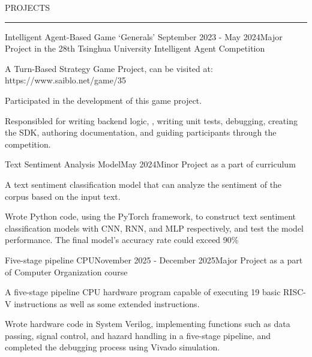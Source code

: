 \documentclass{resume} %
\renewenvironment{rSection}[1]{
\sectionskip
\textcolor{TsinghuaPurple}{\MakeUppercase{#1}}
\sectionlineskip
\hrule
\begin{list}{}{
\setlength{\leftmargin}{0em}
}
\item[]
}{
\end{list}
}
\begin{document}



\begin{rSection}{PROJECTS}

\begin{rSubsection}{Intelligent Agent-Based Game ‘Generals’} {September 2023 - May 2024}{Major Project in the 28th Tsinghua University Intelligent Agent Competition}{}

\item A Turn-Based Strategy Game Project, can be visited at: https://www.saiblo.net/game/35
\item Participated in the development of this game project.
\item Responsibled for writing backend logic, , writing unit tests, debugging, creating the SDK, authoring documentation, and guiding participants through the competition. 
 
\end{rSubsection}  


\begin{rSubsection}{Text Sentiment Analysis Model}{May 2024}{Minor Project as a part of curriculum}{} 
\item A text sentiment classification model that can analyze the sentiment of the corpus based on the input text.
\item Wrote Python code, using the PyTorch framework, to construct text sentiment classification models with CNN, RNN, and MLP respectively, and test the model performance. The final model’s accuracy rate could exceed 90\%  

\end{rSubsection}



\begin{rSubsection}{Five-stage pipeline CPU}{November 2025 - December 2025}{Major Project as a part of Computer Organization course}{}

\item A five-stage pipeline CPU hardware program capable of executing 19 basic RISC-V instructions as well as some extended instructions.
\item Wrote hardware code in System Verilog, implementing functions such as data passing, signal control, and hazard handling in a five-stage pipeline, and completed the debugging process using Vivado simulation.


\end{rSubsection}
\end{rSection}
\end{document}
